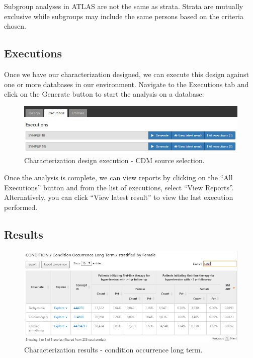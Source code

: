 \documentclass[11pt]{book}
\theoremstyle{definition}
\theoremstyle{definition}
\theoremstyle{definition}
\theoremstyle{remark}
\let\BeginKnitrBlock\begin \let\EndKnitrBlock\end
\begin{document}
\BeginKnitrBlock{rmdimportant}
Subgroup analyses in ATLAS are not the same as strata. Strata are mutually exclusive while subgroups may include the same persons based on the criteria chosen.
\EndKnitrBlock{rmdimportant}

\hypertarget{executions}{%
\subsection{Executions}\label{executions}}

Once we have our characterization designed, we can execute this design against one or more databases in our environment. Navigate to the Executions tab and click on the Generate button to start the analysis on a database:

\begin{figure}

{\centering \includegraphics[width=1\linewidth]{images/Characterization/atlasCharacterizationExecutions} 

}

\caption{Characterization design execution - CDM source selection.}\label{fig:atlasCharacterizationExecutions}
\end{figure}

Once the analysis is complete, we can view reports by clicking on the ``All Executions'' button and from the list of executions, select ``View Reports''. Alternatively, you can click ``View latest result'' to view the last execution performed.

\hypertarget{results}{%
\subsection{Results}\label{results}}

\begin{figure}

{\centering \includegraphics[width=1\linewidth]{images/Characterization/atlasCharacterizationResultsSummary} 

}

\caption{Characterization results - condition occurrence long term.}\label{fig:atlasCharacterizationResultsSummary}
\end{figure}
\end{document}
